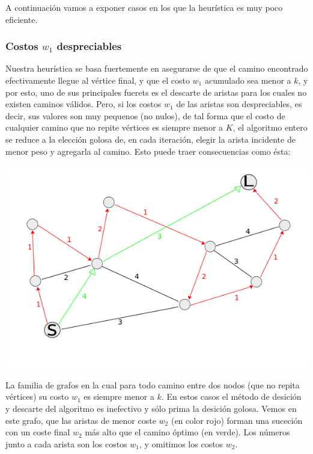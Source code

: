 A continuaci\'on vamos a exponer casos en los que la heur\'istica es muy poco eficiente.
\subsubsection{Costos $w_1$ despreciables}

Nuestra heur\'istica se basa fuertemente en asegurarse de que el camino encontrado efectivamente llegue al v\'ertice final, y que el costo $w_1$ acumulado sea menor a $k$, y por esto, uno de sus principales fuerets es el descarte de aristas para los cuales no existen caminos v\'alidos. Pero, si los costos $w_1$ de las aristas son despreciables, es decir, sus valores son muy pequenos (no nulos), de tal forma que el costo de cualquier camino que no repite v\'ertices es siempre menor a $K$, el algoritmo entero se reduce a la elecci\'on golosa de, en cada iteraci\'on, elegir la arista incidente de menor peso y agregarla al camino. Esto puede traer consecuencias como \'esta:

\begin{center}
\includegraphics[scale=0.7]{grafoCaminoMasLargo.png}
\end{center}
\vspace{2mm}

La familia de grafos en la cual para todo camino entre dos nodos (que no repita v\'ertices) su costo $w_1$ es siempre menor a $k$. En estos casos el m\'etodo de desici\'on y descarte del algoritmo es inefectivo y s\'olo prima la desici\'on golosa. Vemos en este grafo, que las aristas de menor coste $w_2$ (en color rojo) forman una suceci\'on con un coste final $w_2$ m\'as alto que el camino \'optimo (en verde). Los n\'umeros junto a cada arista son los costos $w_1$, y omitimos los costos $w_2$.


